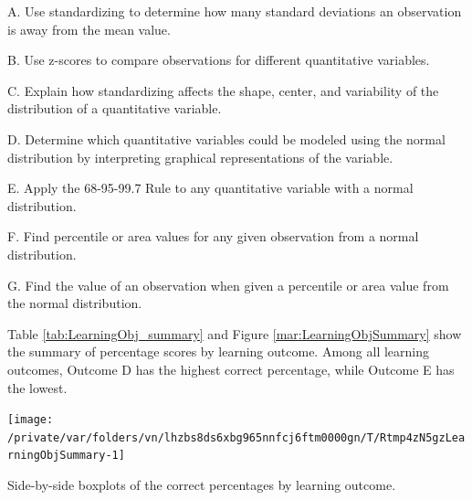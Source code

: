 \documentclass[12pt,english,nohyper]{tufte-handout}\usepackage[]{graphicx}\usepackage[]{color}
\newenvironment{knitrout}{}{} %
\begin{document}
\noindent A. Use standardizing to determine how many standard deviations an observation is away from the mean value. 

\vspace{4mm}\noindent B. Use z-scores to compare observations for different quantitative variables.  

\vspace{4mm}\noindent C. Explain how standardizing affects the shape, center, and variability of the distribution of a quantitative variable.  

\vspace{4mm}\noindent D. Determine which quantitative variables could be modeled using the normal distribution by interpreting graphical representations of the variable. 

\vspace{4mm}\noindent E. Apply the 68-95-99.7 Rule to any quantitative variable with a normal distribution. 

\vspace{4mm}\noindent F. Find percentile or area values for any given observation from a normal distribution. 

\vspace{4mm}\noindent G. Find the value of an observation when given a percentile or area value from the normal distribution. 

\vspace{4mm}

\newpage{}

Table \ref{tab:LearningObj_summary} and Figure \ref{mar:LearningObjSummary} show the summary of percentage scores by learning outcome.
Among all learning outcomes, Outcome
D
has the highest correct percentage, while Outcome
E
has the lowest.



\begin{knitrout}
\color{fgcolor}\begin{marginfigure}
\texttt{[image: /private/var/folders/vn/lhzbs8ds6xbg965nnfcj6ftm0000gn/T/Rtmp4zN5gzLearningObjSummary-1]} \caption[Side-by-side boxplots of the correct percentages by learning outcome]{Side-by-side boxplots of the correct percentages by learning outcome.}\label{mar:LearningObjSummary}
\end{marginfigure}


\end{knitrout}
\end{document}
